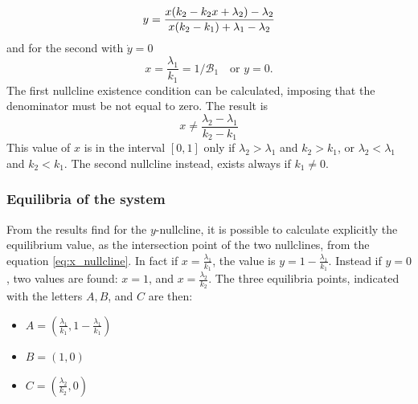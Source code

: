 \begin{equation}\\
\label{eq:x_nullcline}
 y = \frac{x(k_2 - k_2 x + \lambda_2) - \lambda_2}{x(k_2 - k_1)+ \lambda_1- \lambda_2}
\end{equation}
and for the second with $\dot{y} = 0$
\[x = \frac{\lambda_1}{k_1} = 1/\mathcal{B}_1 \quad \text{or } y = 0.
\]
The first nullcline existence condition can be calculated, imposing that the denominator must be not equal to zero. The result is
\[ x \neq \frac{\lambda_2-\lambda_1}{k_2 - k_1} \]
This value of $x$ is in the interval $[0,1]$ only if $\lambda_2>\lambda_1$ and $k_2 > k_1$, or $\lambda_2<\lambda_1$ and $k_2 < k_1$. The second nullcline instead, exists always if $k_1 \neq 0$.

\subsubsection{Equilibria of the system}
From the results find for the $y$-nullcline, it is possible to calculate explicitly the equilibrium value, as the intersection point of the two nullclines, from the equation \ref{eq:x_nullcline}. In fact if $x =\frac{\lambda_1}{k_1}$, the value is $y = 1 -\frac{\lambda_1}{k_1}$.
Instead if $y = 0$, two values are found: $x = 1$, and $x = \frac{\lambda_2}{k_2}$.
The three equilibria points, indicated with the letters $A,B$, and $C$ are then:
\begin{itemize}
	\item $A = (\frac{\lambda_1}{k_1}, 1-\frac{\lambda_1}{k_1})$
	\item $B = (1, 0)$
	\item $C = (\frac{\lambda_2}{k_2}, 0)$
\end{itemize}


